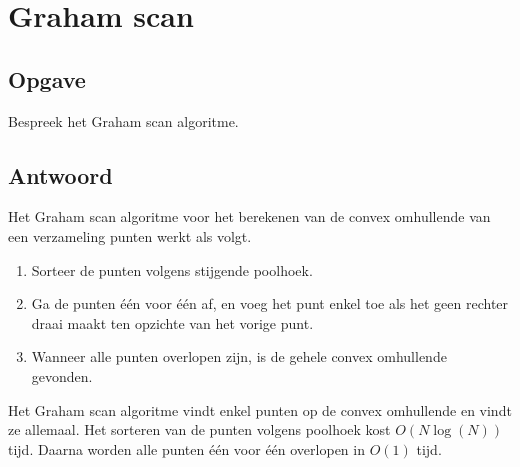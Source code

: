 \documentclass[examenvragen.tex]{subfiles}
\begin{document}
\section{Graham scan}
\subsection{Opgave}
Bespreek het Graham scan algoritme.

\subsection{Antwoord}
Het Graham scan algoritme voor het berekenen van de convex omhullende van een verzameling punten werkt als volgt.
\begin{enumerate}
\item Sorteer de punten volgens stijgende poolhoek.
\item Ga de punten \'e\'en voor \'e\'en af, en voeg het punt enkel toe als het geen rechter draai maakt ten opzichte van het vorige punt.
\item Wanneer alle punten overlopen zijn, is de gehele convex omhullende gevonden.
\end{enumerate}
Het Graham scan algoritme vindt enkel punten op de convex omhullende en vindt ze allemaal. Het sorteren van de punten volgens poolhoek kost $O(N\log(N))$ tijd. Daarna worden alle punten \'e\'en voor \'e\'en overlopen in $O(1)$ tijd.
\end{document}
